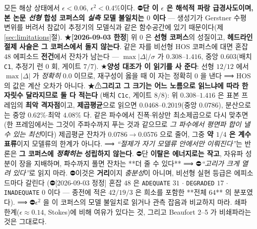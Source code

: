 \documentclass[11pt]{report}
\numberwithin{equation}{chapter}
\numberwithin{figure}{chapter}
\numberwithin{table}{chapter}
\begin{document}
모든 해상 상태에서 $\epsilon < 0.06$, $\epsilon^2 < 0.4\%$이다.
⛔\textbf{단 이 $\epsilon$ 은 해석적 파랑 급경사도이며, 본 논문 \emph{선형} 합성
코퍼스의 \emph{실측} 모델 불일치는 $0$ 이다} --- 생성기가 Gerstner 수평 변위를 버려서
참값이 추정기의 모델식과 같은 함수공간에 있기 때문이다(제\ref{sec:limitations}절).
★\textbf{[2026-09-03 한정]} 위 $0$ 은 \textbf{선형 코퍼스}의 성질이고,
\textbf{헤드라인 절제 사슬은 그 코퍼스에서 돌지 않는다}. 같은 자를 비선형 HOS
코퍼스에 대면 혼잡 $48$ 에피소드 \textbf{전건}에서 잔차가 남는다 ---
$\max|\Delta|/\sigma$ 가 $0.308$--$1.416$, 중앙 $0.603$(배치 \texttt{C1},
추정기 런 $0$ 회, 게이트 $7/7$). ★\textbf{양성 대조가 이 읽기를 사 준다}: 선형
$12/12$ 에서 $\max|\Delta|$ 가 \emph{정확히} $0.0$ 이므로, 재구성이 옳을 때 이 자는
정확히 $0$ 을 낸다 ⟹ HOS 의 값은 계산 오차가 아니다.
★⚠\textbf{그리고 그 크기는 어느 노름으로 읽느냐에 따라 한 자릿수 달라지므로 둘 다 적는다}
(배치 \texttt{C1c}, 게이트 $8/8$): 위 $0.308$--$1.416$ 은 표본 프레임의 \textbf{최악
격자점}이고, %
\textbf{제곱평균}으로 읽으면 $0.0468$--$0.2019$(중앙 $\mathbf{0.0786}$),
분산으로는 중앙 \textbf{$0.62\%$}$\cdot$최악 \textbf{$4.08\%$} 다. 같은 파수에서
진폭$\cdot$위상만 최소제곱으로 다시 맞추면(한 프레임에서는 그것이 주파수까지 푸는 것과
같으므로 \emph{그 파수에서 평면파 합이 낼 수 있는 최선}이다) 제곱평균 잔차가
$0.0786 \to \mathbf{0.0576}$ 으로 줄어, 그중 \textbf{약 $1/4$ 은 계수 표류}이지
모델류의 한계가 아니다.
⟹ \emph{``절제가 자기 모델류 안에서만 이뤄진다''}는 반론은 \textbf{그 코퍼스에
\emph{정확히는} 성립하지 않는다}. ⛔단 \textbf{이탈은 에너지로는 작고}, 자유파 성분이
장을 지배하며, 파수까지 풀면 잔차는 **더 줄 수 있다** ⟹ ⛔\emph{``고리가 크게 열려
있다''}로 읽지 마라. ⛔이것은 \textbf{거리}이지 \emph{충분성}이 아니며,
비선형 실현 등급은 에피소드마다 갈린다
(⛔[2026-09-03 정정] 혼잡 $48$ 은 \texttt{ADEQUATE} $31$ $\cdot$ \texttt{DEGRADED} $17$
$\cdot$ \texttt{INADEQUATE} $0$ 이다 --- 종전에 적은 $42/19/3$ 은 희소를 포함한
**전체 $64$** 의 분포였다).
⟹ ⛔$\epsilon^2$ 을 이 코퍼스의 모델 불일치로 읽거나 관측 잡음과 비교하지 마라.
쇄파 한계($\epsilon \approx 0.14$, Stokes)에 비해 여유가 있다는 것,
그리고 Beaufort 2--5 가 비쇄파라는 것은 그대로다.
\end{document}
